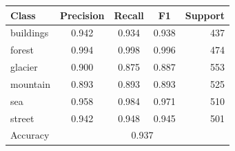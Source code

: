 \begin{tabular}{lcccr}
\toprule
Class & Precision & Recall & F1 & Support \\
\midrule
buildings & 0.942 & 0.934 & 0.938 & 437 \\
forest & 0.994 & 0.998 & 0.996 & 474 \\
glacier & 0.900 & 0.875 & 0.887 & 553 \\
mountain & 0.893 & 0.893 & 0.893 & 525 \\
sea & 0.958 & 0.984 & 0.971 & 510 \\
street & 0.942 & 0.948 & 0.945 & 501 \\
\midrule
Accuracy & \multicolumn{4}{c}{0.937} \\
\bottomrule
\end{tabular}
